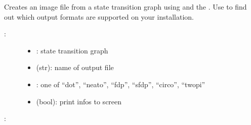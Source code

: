 \documentclass[letterpaper,10pt,english]{sphinxmanual}
\begin{document}
\begin{fulllineitems}
\label{\detokenize{StateTransitionGraphs:PyBoolNet.StateTransitionGraphs.stg2image}}
Creates an image file from a state transition graph using {\hyperref[\detokenize{Installation:installation-graphviz}]{}} and the .
Use  to find out which output formats are supported on your installation.
\begin{description}
\item[{:}] \leavevmode\begin{itemize}
\item {} 
: state transition graph

\item {} 
 (str): name of output file

\item {} 
: one of “dot”, “neato”, “fdp”, “sfdp”, “circo”, “twopi”

\item {} 
 (bool): print infos to screen

\end{itemize}

\end{description}

:

\begin{sphinxVerbatim}[commandchars=\\\{\}]
 
  
  
\end{sphinxVerbatim}

\end{fulllineitems}
\end{document}
